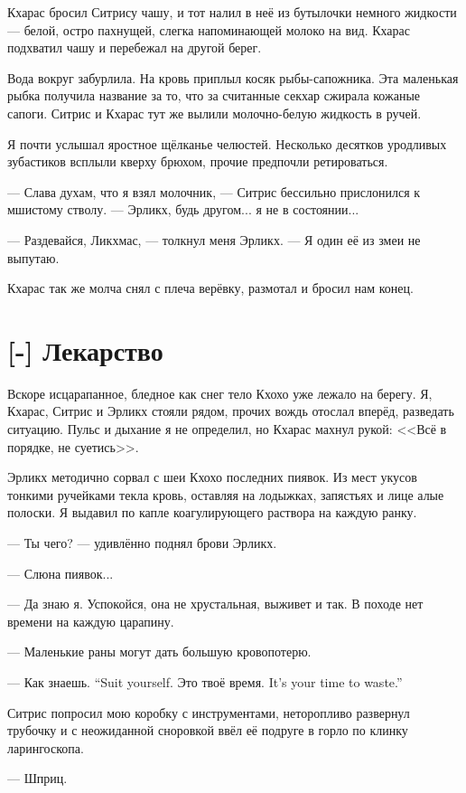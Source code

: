 Кхарас бросил Ситрису чашу, и тот налил в неё из бутылочки немного жидкости --- белой, остро пахнущей, слегка напоминающей молоко на вид.
Кхарас подхватил чашу и перебежал на другой берег.

Вода вокруг забурлила.
На кровь приплыл косяк рыбы-сапожника.
Эта маленькая рыбка получила название за то, что за считанные секхар сжирала кожаные сапоги.
Ситрис и Кхарас тут же вылили молочно-белую жидкость в ручей.

Я почти услышал яростное щёлканье челюстей.
Несколько десятков уродливых зубастиков всплыли кверху брюхом, прочие предпочли ретироваться.

--- Слава духам, что я взял молочник, --- Ситрис бессильно прислонился к мшистому стволу.
--- Эрликх, будь другом... я не в состоянии...

--- Раздевайся, Ликхмас, --- толкнул меня Эрликх.
--- Я один её из змеи не выпутаю.

Кхарас так же молча снял с плеча верёвку, размотал и бросил нам конец.

\section{[-] Лекарство}

Вскоре исцарапанное, бледное как снег тело Кхохо уже лежало на берегу.
Я, Кхарас, Ситрис и Эрликх стояли рядом, прочих вождь отослал вперёд, разведать ситуацию.
Пульс и дыхание я не определил, но Кхарас махнул рукой: <<Всё в порядке, не суетись>>.

Эрликх методично сорвал с шеи Кхохо последних пиявок.
Из мест укусов тонкими ручейками текла кровь, оставляя на лодыжках, запястьях и лице алые полоски.
Я выдавил по капле коагулирующего раствора на каждую ранку.

--- Ты чего? --- удивлённо поднял брови Эрликх.

--- Слюна пиявок...

--- Да знаю я.
Успокойся, она не хрустальная, выживет и так.
В походе нет времени на каждую царапину.

--- Маленькие раны могут дать большую кровопотерю.

{--- Как знаешь.}
{``Suit yourself.}
{Это твоё время.}
{It's your time to waste.''}

Ситрис попросил мою коробку с инструментами, неторопливо развернул трубочку и с неожиданной сноровкой ввёл её подруге в горло по клинку ларингоскопа.

--- Шприц.


